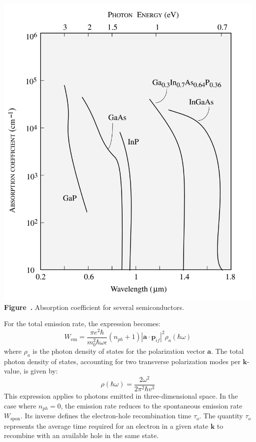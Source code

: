 \begin{center}
	\begin{minipage}{0.5\textwidth}
		\centering
		\includegraphics[width=\textwidth]{img/Abs_coeff.png}
		\\[0.5em]
		\textbf{Figure~\thefigure.} Absorption coeﬃcient for several semiconductors.
		\label{fig:Abs_coeff}
	\end{minipage}
\end{center}
For the total emission rate, the expression becomes:
\begin{equation}
	W_{\text{em}} = \frac{\pi e^2 \hbar}{m_0^2 \hbar \omega \epsilon} \left( n_{ph} + 1 \right) \left| \mathbf{a} \cdot \mathbf{p}_{if} \right|^2 \rho_a(\hbar \omega)
\end{equation}
where \(\rho_a\) is the photon density of states for the polarization vector \(\mathbf{a}\). The total photon density of states, accounting for two transverse polarization modes per \(\mathbf{k}\)-value, is given by:
\begin{equation}
	\rho(\hbar \omega) = \frac{2 \omega^2}{2 \pi^2 \hbar v^3}
\end{equation}
This expression applies to photons emitted in three-dimensional space. In the case where \(n_{ph} = 0\), the emission rate reduces to the spontaneous emission rate \(W_{\text{spon}}\). Its inverse defines the electron-hole recombination time \(\tau_o\). The quantity \(\tau_o\) represents the average time required for an electron in a given state \(\mathbf{k}\) to recombine with an available hole in the same state.



